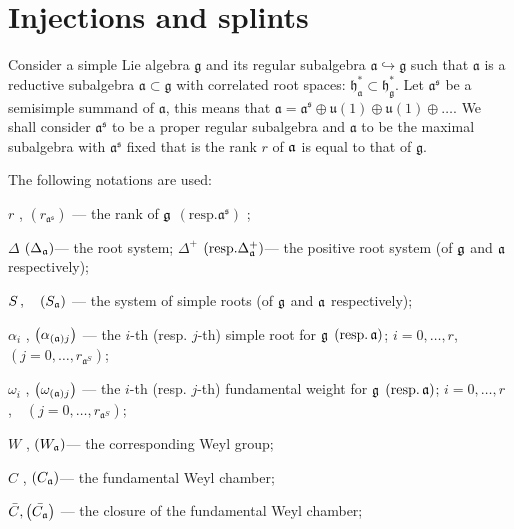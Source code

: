 \section{Injections and splints}

\label{sec:Injections and splints}

Consider a simple Lie algebra $\mathfrak{g}$ and its regular subalgebra $%
\mathfrak{a}\hookrightarrow \mathfrak{g}$ such that $\mathfrak{a}$
is a
reductive subalgebra $\mathfrak{a \subset g}$ with correlated root spaces: $%
\mathfrak{h}_{\mathfrak{a}}^{\ast }\subset \mathfrak{h}_{\mathfrak{g }%
}^{\ast }$. Let $\mathfrak{a}^{\mathfrak{s}}$ be a semisimple summand of
$\mathfrak{a}$,
this means that $\mathfrak{a}=\mathfrak{a}^{\mathfrak{s}} \oplus \mathfrak{u}(1)\oplus %
\mathfrak{u}(1)\oplus \dots$. We shall consider $\mathfrak{a}^{\mathfrak{s}}$
to be a proper regular subalgebra and $\mathfrak{a}$ to be the
maximal subalgebra with $\mathfrak{a}^{\mathfrak{s}}$ fixed that is the rank
$r$ of $\frak{a}$ is equal to that of $\mathfrak{g}$.

The following notations are used:

$r$ , $\left( r_{\mathfrak{a}^{\mathfrak{s}}}\right) $ --- the rank of
$\frak{g}$ $\left( \mathrm{{resp. }\mathfrak{a}^{\mathfrak{s}}}\right) $ ;

$\Delta $ $\left( \Delta _{\frak{a}}\right) $--- the root system;
$\Delta ^{+} $ $\left( \mathrm{{resp. }\Delta
_{\frak{a}}^{+}}\right) $--- the positive root system (of
$\frak{g}$ and $\frak{a}$ respectively);

$S \, ,\quad \left( S_{\frak{a}}\right) $ --- the system of simple roots (of $%
\frak{g}$ and $\frak{a}$ respectively);

$\alpha _{i}$ , $\left( \alpha _{\left( \frak{a}\right) j}\right) $ --- the $%
i$-th (resp. $j$-th) simple root for $\frak{g}$  $\left( \mathrm{{resp. \,} \frak{%
a}}\right) $; $i=0,\ldots ,r$,\ \ $\left( j=0,\ldots ,r_{\mathfrak{a}%
^S}\right) $;

$\omega _{i}$ , $\left( \omega _{\left( \frak{a}\right) j}\right) $ --- the $%
i$-th (resp. $j$-th) fundamental weight for $\frak{g}$ $\left( \mathrm{{resp. \,}\frak{%
a}}\right) $; $i=0,\ldots ,r$,\ \ $\left( j=0,\ldots ,r_{\mathfrak{a}%
^S}\right) $;

$W$ , $\left( W_{\frak{a}}\right) $--- the corresponding Weyl group;

$C$ , $\left( C_{\frak{a}}\right) $--- the fundamental Weyl chamber;

$\bar{C}, \left(\bar{C_{\frak{a}}}\right)$ --- the closure of the
fundamental Weyl chamber;

